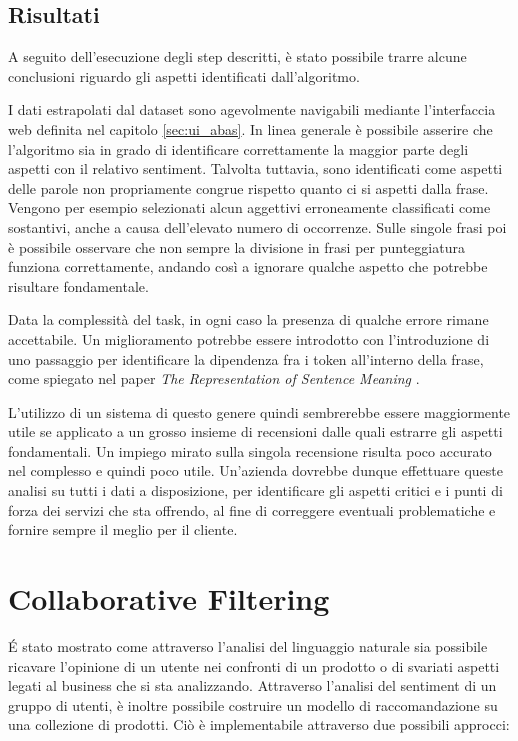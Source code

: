 \documentclass[hidelinks, 12pt]{article}
\begin{document}
\subsection{Risultati}

A seguito dell'esecuzione degli step descritti, è stato possibile trarre alcune conclusioni riguardo gli aspetti identificati dall'algoritmo.

I dati estrapolati dal dataset sono agevolmente navigabili mediante l'interfaccia web definita nel capitolo \ref{sec:ui_abas}. In linea generale è possibile asserire che l'algoritmo sia in grado di identificare correttamente la maggior parte degli aspetti con il relativo sentiment. Talvolta tuttavia, sono identificati come aspetti delle parole non propriamente congrue rispetto quanto ci si aspetti dalla frase. Vengono per esempio selezionati alcun aggettivi erroneamente classificati come sostantivi, anche a causa dell'elevato numero di occorrenze. Sulle singole frasi poi è possibile osservare che non sempre la divisione in frasi per punteggiatura funziona correttamente, andando così a ignorare qualche aspetto che potrebbe risultare fondamentale.

Data la complessità del task, in ogni caso la presenza di qualche errore rimane accettabile. Un miglioramento potrebbe essere introdotto con l'introduzione di uno passaggio per identificare la dipendenza fra i token all'interno della frase, come spiegato nel paper \textit{The Representation of Sentence Meaning} \cite{site:the_representation_of_sentence_meaning}.

L'utilizzo di un sistema di questo genere quindi sembrerebbe essere maggiormente utile se applicato a un grosso insieme di recensioni dalle quali estrarre gli aspetti fondamentali. Un impiego mirato sulla singola recensione risulta poco accurato nel complesso e quindi poco utile. Un'azienda dovrebbe dunque effettuare queste analisi su tutti i dati a disposizione, per identificare gli aspetti critici e i punti di forza dei servizi che sta offrendo, al fine di correggere eventuali problematiche e fornire sempre il meglio per il cliente.



\clearpage



\section{Collaborative Filtering}
\label{sec:collaborative}


É stato mostrato come attraverso l'analisi del linguaggio naturale sia possibile ricavare l'opinione di un utente nei confronti di un prodotto o di svariati aspetti legati al business che si sta analizzando. Attraverso l'analisi del sentiment di un gruppo di utenti, è inoltre possibile costruire un modello di raccomandazione su una collezione di prodotti. Ciò è implementabile attraverso due possibili approcci:
\end{document}
